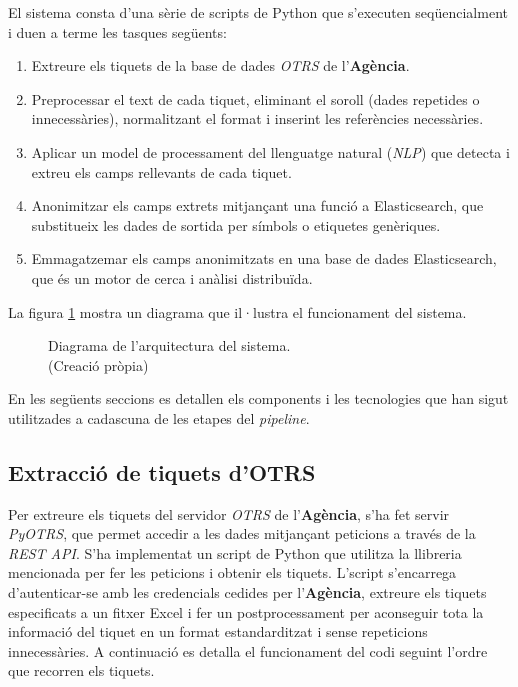 El sistema consta d'una sèrie de scripts de Python que s'executen seqüencialment i duen a terme les tasques següents:

\begin{enumerate}
     \item Extreure els tiquets de la base de dades \textit{OTRS} de l'\textbf{Agència}.
     \item Preprocessar el text de cada tiquet, eliminant el soroll (dades repetides o innecessàries), normalitzant el format i inserint les referències necessàries.
     \item Aplicar un model de processament del llenguatge natural (\textit{NLP}) que detecta i extreu els camps rellevants de cada tiquet.
     \item Anonimitzar els camps extrets mitjançant una funció a Elasticsearch, que substitueix les dades de sortida per símbols o etiquetes genèriques.
     \item Emmagatzemar els camps anonimitzats en una base de dades Elasticsearch, que és un motor de cerca i anàlisi distribuïda.
\end{enumerate}

La figura \ref{fig:pipeline} mostra un diagrama que il·lustra el funcionament del sistema.

\begin{figure}[H]
     \centering
     \vspace{1cm} %
     \setlength{\fboxsep}{5pt} %
     \setlength{\fboxrule}{0pt} %
     \caption[Diagrama de l'arquitectura del sistema]{Diagrama de l'arquitectura del sistema. \\ (Creació pròpia)}
     \label{fig:pipeline}
\end{figure}

En les següents seccions es detallen els components i les tecnologies que han sigut utilitzades a cadascuna de les etapes del \textit{pipeline}.
\subsection{Extracció de tiquets d'OTRS}
Per extreure els tiquets del servidor \textit{OTRS} de l'\textbf{Agència}, s'ha fet servir \textit{PyOTRS}, que permet accedir a les dades mitjançant peticions a través de la \textit{REST API}. S'ha implementat un script de Python que utilitza la llibreria mencionada per fer les peticions i obtenir els tiquets. L'script s'encarrega d'autenticar-se amb les credencials cedides per l'\textbf{Agència}, extreure els tiquets especificats a un fitxer Excel i fer un postprocessament per aconseguir tota la informació del tiquet en un format estandarditzat i sense repeticions innecessàries. A continuació es detalla el funcionament del codi seguint l'ordre que recorren els tiquets.

